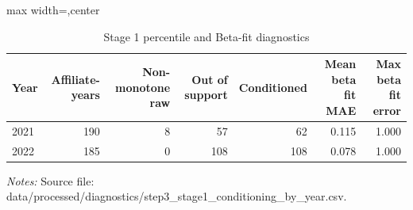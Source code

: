 \begin{table}[H]
\centering
\scriptsize
\caption{Stage 1 percentile and Beta-fit diagnostics}
\label{tab:app_stage1_conditioning}
\begin{adjustbox}{max width=\textwidth,center}
\begin{tabular}{@{}lrrrrrr@{}}
\toprule
Year & Affiliate-years & Non-monotone raw & Out of support & Conditioned & Mean beta fit MAE & Max beta fit error \\
\midrule
2021 & 190 & 8 &  57 &  62 & 0.115 & 1.000 \\
2022 & 185 & 0 & 108 & 108 & 0.078 & 1.000 \\
\bottomrule
\end{tabular}
\end{adjustbox}

\vspace{0.5em}
\begin{minipage}{0.96\textwidth}
\footnotesize\raggedright \textit{Notes:} Source file: data/processed/diagnostics/step3\_stage1\_conditioning\_by\_year.csv.
\end{minipage}
\end{table}
